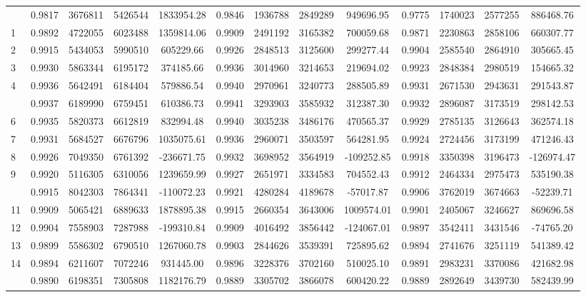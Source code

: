 \documentclass[
  12pt,
]{article}
\begin{document}
\begin{longtable}[t]{lcccccccccccc}
\endfoot
\bottomrule
\endlastfoot
0 & 0.9817 & 3676811 & 5426544 & 1833954.28 & 0.9846 & 1936788 & 2849289 & 949696.95 & 0.9775 & 1740023 & 2577255 & 886468.76\\
1 & 0.9892 & 4722055 & 6023488 & 1359814.06 & 0.9909 & 2491192 & 3165382 & 700059.68 & 0.9871 & 2230863 & 2858106 & 660307.77\\
2 & 0.9915 & 5434053 & 5990510 & 605229.66 & 0.9926 & 2848513 & 3125600 & 299277.44 & 0.9904 & 2585540 & 2864910 & 305665.45\\
3 & 0.9930 & 5863344 & 6195172 & 374185.66 & 0.9936 & 3014960 & 3214653 & 219694.02 & 0.9923 & 2848384 & 2980519 & 154665.32\\
4 & 0.9936 & 5642491 & 6184404 & 579886.54 & 0.9940 & 2970961 & 3240773 & 288505.89 & 0.9931 & 2671530 & 2943631 & 291543.87\\
\addlinespace
5 & 0.9937 & 6189990 & 6759451 & 610386.73 & 0.9941 & 3293903 & 3585932 & 312387.30 & 0.9932 & 2896087 & 3173519 & 298142.53\\
6 & 0.9935 & 5820373 & 6612819 & 832994.48 & 0.9940 & 3035238 & 3486176 & 470565.37 & 0.9929 & 2785135 & 3126643 & 362574.18\\
7 & 0.9931 & 5684527 & 6676796 & 1035075.61 & 0.9936 & 2960071 & 3503597 & 564281.95 & 0.9924 & 2724456 & 3173199 & 471246.43\\
8 & 0.9926 & 7049350 & 6761392 & -236671.75 & 0.9932 & 3698952 & 3564919 & -109252.85 & 0.9918 & 3350398 & 3196473 & -126974.47\\
9 & 0.9920 & 5116305 & 6310056 & 1239659.99 & 0.9927 & 2651971 & 3334583 & 704552.43 & 0.9912 & 2464334 & 2975473 & 535190.38\\
\addlinespace
10 & 0.9915 & 8042303 & 7864341 & -110072.23 & 0.9921 & 4280284 & 4189678 & -57017.87 & 0.9906 & 3762019 & 3674663 & -52239.71\\
11 & 0.9909 & 5065421 & 6889633 & 1878895.38 & 0.9915 & 2660354 & 3643006 & 1009574.01 & 0.9901 & 2405067 & 3246627 & 869696.58\\
12 & 0.9904 & 7558903 & 7287988 & -199310.84 & 0.9909 & 4016492 & 3856442 & -124067.01 & 0.9897 & 3542411 & 3431546 & -74765.20\\
13 & 0.9899 & 5586302 & 6790510 & 1267060.78 & 0.9903 & 2844626 & 3539391 & 725895.62 & 0.9894 & 2741676 & 3251119 & 541389.42\\
14 & 0.9894 & 6211607 & 7072246 & 931445.00 & 0.9896 & 3228376 & 3702160 & 510025.10 & 0.9891 & 2983231 & 3370086 & 421682.98\\
\addlinespace
15 & 0.9890 & 6198351 & 7305808 & 1182176.79 & 0.9889 & 3305702 & 3866078 & 600420.22 & 0.9889 & 2892649 & 3439730 & 582439.99\\

\end{longtable}
\end{document}
